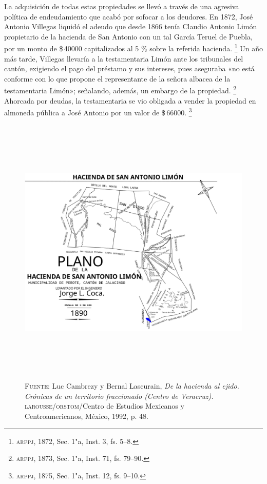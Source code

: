 \documentclass[14pt,twoside,final]{extbook} %
\let\oldfootnote\footnote
\renewcommand\footnote[1]{%
\oldfootnote{\hspace{1mm}#1}}
\begin{document}
La adquisición de todas estas propiedades se llevó a través de una agresiva política de endeudamiento que acabó por sofocar a los deudores. En 1872, José Antonio Villegas liquidó el adeudo que desde 1866 tenía Claudio Antonio Limón propietario de la hacienda de San Antonio con un tal García Teruel de Puebla, por un monto de \$\,40000 capitalizados al 5 \% sobre la referida hacienda.\footnote{\textsc{arppj}, 1872, Sec. 1"a, Inst. 3, fs. 5--8.} Un año más tarde, Villegas llevaría a la testamentaria Limón ante los tribunales del cantón, exigiendo el pago del préstamo y sus intereses, pues aseguraba «no está conforme con lo que propone el representante de la señora albacea de la testamentaria Limón»; señalando, además, un embargo de la propiedad.\footnote{\textsc{arppj}, 1873, Sec. 1"a, Inst. 71, fs. 79--90.} Ahorcada por deudas, la testamentaria se vio obligada a vender la propiedad en almoneda pública a José Antonio por un valor de \$\,66000.\footnote{\textsc{arppj}, 1875, Sec. 1"a, Inst. 12, fs. 9--10.}
\begin{figure}
\centering
\includegraphics[height=13.1cm]{limon} %
\caption[Plano de la hacienda de San Antonio Limón]{\textsc{Fuente:} Luc Cambrezy y Bernal Lascurain, \emph{De la hacienda al ejido. Crónicas de un territorio fraccionado (Centro de Veracruz).} \textsc{larousse/orstom}/Centro de Estudios Mexicanos y Centroamericanos, México, 1992, p. 48.}
\label{fig:hda-limon}
\end{figure}
\end{document}
